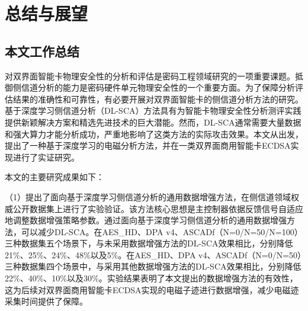 \chapter{总结与展望}\label{chap:conclusion}{
	\section{本文工作总结}
	对双界面智能卡物理安全性的分析和评估是密码工程领域研究的一项重要课题。抵御侧信道分析的能力是密码硬件单元物理安全性的一个重要方面。为了保障分析评估结果的准确性和可靠性，有必要开展对双界面智能卡的侧信道分析方法的研究。基于深度学习侧信道分析（DL-SCA）方法具有为智能卡物理安全性分析测评实践提供新颖解决方案和精选先进技术的巨大潜能。然而，DL-SCA通常需要大量数据和强大算力才能分析成功，严重地影响了这类方法的实际攻击效果。本文从\jiaodu 出发，提出了一种基于深度学习的电磁分析方法，并在一类双界面商用智能卡ECDSA实现进行了实证研究。
	
	本文的主要研究成果如下：
	
	（1）提出了面向基于深度学习侧信道分析的通用数据增强方法，在侧信道领域权威公开数据集上进行了实验验证。该方法核心思想是主控制器依据反馈信号自适应地调整数据增强策略参数。通过面向基于深度学习侧信道分析的通用数据增强方法，可以减少DL-SCA\chenggongtiaoshu。在AES\_HD、DPA v4、ASCADf（N=0/N=50/N=100）三种数据集五个场景下，与未采用数据增强方法的DL-SCA效果相比，\chenggongtiaoshu 分别降低21\%、25\%、24\%、48\%以及5\%。在AES\_HD、DPA v4、ASCADf（N=0/N=50）三种数据集四个场景中，与采用其他数据增强方法的DL-SCA效果相比，\chenggongtiaoshu 分别降低22\%、40\%、10\%以及30\%。实验结果表明了本文提出的数据增强方法的有效性，这为后续对双界面商用智能卡ECDSA实现的电磁子迹进行数据增强，减少电磁迹采集时间提供了保障。
	
}
